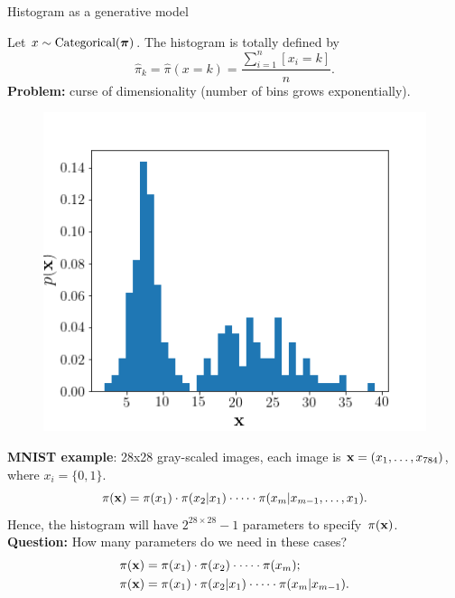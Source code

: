 \begin{frame}{Histogram as a generative model}
	
	\begin{minipage}[t]{0.6\columnwidth}
	    Let $x \sim \text{Categorical}(\boldsymbol{\pi})$. The histogram is totally defined by
		\[
		    \hat{\pi}_k = \hat{\pi}(x = k) = \frac{\sum_{i=1}^n [x_i = k]}{n}.
		\]
		\textbf{Problem:} curse of dimensionality (number of bins grows exponentially). \\
		\end{minipage}%
		\begin{minipage}[t]{0.4\columnwidth}
	    \begin{figure}[h]
	        \centering
	        \includegraphics[width=\linewidth]{figs/histogram.png}
	    \end{figure}
	\end{minipage}
	\textbf{MNIST example}: 28x28 gray-scaled images, each image is $\mathbf{x} = (x_1, \dots, x_{784})$, where $x_i = \{0, 1\}$. 
	\[
	    \pi(\mathbf{x}) = \pi(x_1) \cdot \pi(x_2 | x_1) \cdot \dots \cdot \pi(x_m | x_{m-1}, \dots, x_1).
	\]
	Hence, the histogram will have $2^{28 \times 28} - 1$ parameters to specify~$\pi(\mathbf{x})$. \\
	\textbf{Question:} How many parameters do we need in these cases?
	\begin{align*}
	    \pi(\mathbf{x}) &= \pi(x_1) \cdot \pi(x_2)\cdot \dots \cdot \pi(x_m); \\
	    \pi(\mathbf{x}) &= \pi(x_1) \cdot \pi(x_2 | x_1) \cdot \dots \cdot \pi(x_m | x_{m-1}).
	\end{align*}
\end{frame}
